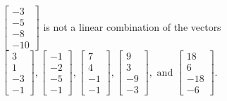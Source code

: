 \begin{exercise}
\begin{exerciseStatement}
  \end{exerciseStatement}
  \begin{exerciseAnswer}
   \(\left[\begin{array}{c}
-3 \\
-5 \\
-8 \\
-10
\end{array}\right]\) 
  	 is not  
	a linear combination of the vectors \(\left[\begin{array}{c}
3 \\
1 \\
-3 \\
-1
\end{array}\right] , \left[\begin{array}{c}
-1 \\
-2 \\
-5 \\
-1
\end{array}\right] , \left[\begin{array}{c}
7 \\
4 \\
-1 \\
-1
\end{array}\right] , \left[\begin{array}{c}
9 \\
3 \\
-9 \\
-3
\end{array}\right] , \text{ and } \left[\begin{array}{c}
18 \\
6 \\
-18 \\
-6
\end{array}\right]\).

	
  


  \end{exerciseAnswer}
\end{exercise}